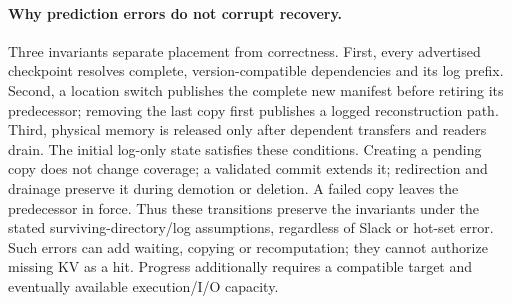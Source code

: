 \paragraph{Why prediction errors do not corrupt recovery.}
Three invariants separate placement from correctness. First, every
advertised checkpoint resolves complete, version-compatible dependencies
and its log prefix. Second, a location switch publishes the complete new
manifest before retiring its predecessor; removing the last copy first
publishes a logged reconstruction path. Third, physical memory is released
only after dependent transfers and readers drain. The initial log-only
state satisfies these conditions. Creating a pending copy does not change
coverage; a validated commit extends it; redirection and drainage preserve
it during demotion or deletion. A failed copy leaves the predecessor in
force. Thus these transitions preserve the invariants under the stated
surviving-directory/log assumptions, regardless of Slack or hot-set error.
Such errors can add waiting, copying or recomputation; they cannot authorize
missing KV as a hit. Progress additionally requires a compatible target
and eventually available execution/I/O capacity.
